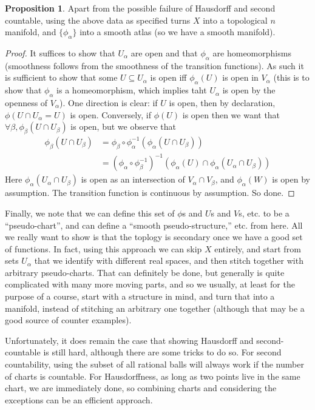\documentclass{article}
\theoremstyle{definition}
\newtheorem{proposition}{Proposition}
\begin{document}
\begin{proposition}
  Apart from the possible failure of Hausdorff and second countable, using the
  above data as specified turns $X$ into a topological $n$ manifold, and
  $\{\phi_\alpha\}$ into a smooth atlas (so we have a smooth manifold).
\end{proposition}

\begin{proof}
  It suffices to show that $U_\alpha$ are open and that $\phi_\alpha$ are
  homeomorphisms (smoothness follows from the smoothness of the transition
  functions). As such it is sufficient to show that some $U \subseteq U_\alpha$
  is open iff $\phi_\alpha(U)$ is open in $V_\alpha$ (this is to show that
  $\phi_\alpha$ is a homeomorphism, which implies taht $U_\alpha$ is open by the
  openness of $V_\alpha$). One direction is clear: if $U$ is open, then by
  declaration, $\phi(U \cap U_\alpha = U)$ is open. Conversely, if $\phi(U)$ is
  open then we want that $\forall \beta, \phi_\beta(U \cap U_\beta)$ is open,
  but we observe that
  \begin{align*}
    \phi_\beta(U \cap U_\beta)
    &= \phi_\beta \circ \phi_\alpha^{-1} (\phi_\alpha(U \cap U_\beta)) \\
    &= (\phi_\alpha \circ \phi_\beta^{-1})^{-1}
      (\phi_\alpha(U) \cap \phi_\alpha(U_\alpha \cap U_\beta))
  \end{align*}
  Here $\phi_\alpha(U_\alpha \cap U_\beta)$ is open as an intersection of
  $V_\alpha \cap V_\beta$, and $\phi_\alpha(W)$ is open by assumption. The
  transition function is continuous by assumption. So done. 
\end{proof}

Finally, we note that we can define this set of $\phi$s and $U$s and $V$s, etc.
to be a ``pseudo-chart'', and can define a ``smooth pseudo-structure,'' etc.
from here. All we really want to show is that the toplogy is secondary once we
have a good set of functions. In fact, using this approach we can skip $X$
entirely, and start from sets $U_\alpha$ that we identify with different real
spaces, and then stitch together with arbitrary pseudo-charts. That can
definitely be done, but generally is quite complicated with many more moving
parts, and so we usually, at least for the purpose of a course, start with a
structure in mind, and turn that into a manifold, instead of stitching an
arbitrary one together (although that may be a good source of counter examples).

Unfortunately, it does remain the case that showing Hausdorff and
second-countable is still hard, although there are some tricks to do so. For
second countability, using the subset of all rational balls will always work if
the number of charts is countable. For Hausdorffness, as long as two points live
in the same chart, we are immediately done, so combining charts and considering
the exceptions can be an efficient approach.
\end{document}
